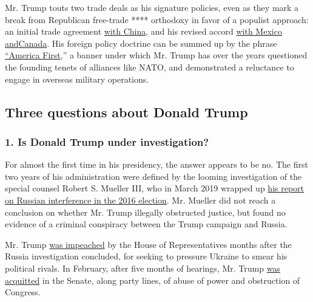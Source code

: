 Mr. Trump touts two trade deals as his signature policies, even as they
mark a break from Republican free-trade **** orthodoxy in favor of a
populist approach: an initial trade agreement
\href{https://www.nytimes3xbfgragh.onion/2020/01/15/business/economy/china-trade-deal.html}{with
China}, and his revised accord
\href{https://www.nytimes3xbfgragh.onion/2019/12/01/us/politics/trump-trade-deal-usmca.html}{with
Mexico
and}\href{https://www.nytimes3xbfgragh.onion/2019/12/01/us/politics/trump-trade-deal-usmca.html}{Canada}.
His foreign policy doctrine can be summed up by the phrase
\href{https://www.nytimes3xbfgragh.onion/2018/12/21/us/politics/trump-mattis-american-first-foreign-policy.html}{``America
First},'' a banner under which Mr. Trump has over the years questioned
the founding tenets of alliances like NATO, and demonstrated a
reluctance to engage in overseas military operations.

\hypertarget{three-questions-about-donald-trump}{%
\subsection{Three questions about Donald
Trump}\label{three-questions-about-donald-trump}}

\hypertarget{1-is-donald-trump-under-investigation}{%
\subsubsection{\texorpdfstring{\textbf{1. Is Donald Trump under
investigation?}}{1. Is Donald Trump under investigation?}}\label{1-is-donald-trump-under-investigation}}

For almost the first time in his presidency, the answer appears to be
no. The first two years of his administration were defined by the
looming investigation of the special counsel Robert S. Mueller III, who
in March 2019 wrapped up
\href{https://www.nytimes3xbfgragh.onion/2019/03/24/us/politics/mueller-report-summary.html}{his
report on Russian interference in the 2016 election}. Mr. Mueller did
not reach a conclusion on whether Mr. Trump illegally obstructed
justice, but found no evidence of a criminal conspiracy between the
Trump campaign and Russia.

Mr. Trump
\href{https://www.nytimes3xbfgragh.onion/2019/12/18/us/politics/trump-impeached.html}{was
impeached} by the House of Representatives months after the Russia
investigation concluded, for seeking to pressure Ukraine to smear his
political rivals. In February, after five months of hearings, Mr. Trump
\href{https://www.nytimes3xbfgragh.onion/2020/02/05/us/politics/trump-acquitted-impeachment.html}{was
acquitted} in the Senate, along party lines, of abuse of power and
obstruction of Congress.

